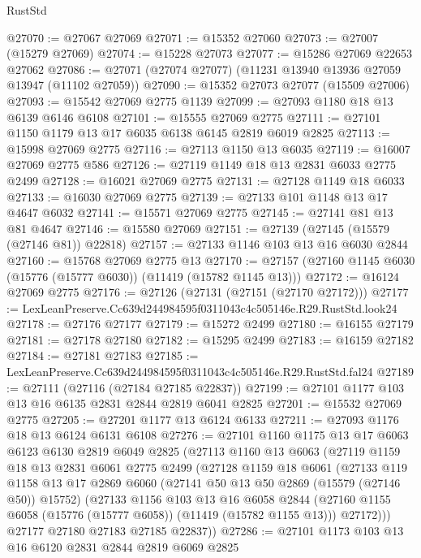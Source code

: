 \begin{lexlean}{RustStd}
\begin{coremodule}
@27070 := @27067 @27069
@27071 := @15352 @27060
@27073 := @27007 (@15279 @27069)
@27074 := @15228 @27073
@27077 := @15286 @27069 @22653 @27062
@27086 := @27071 (@27074 @27077) (@11231 @13940 @13936 @27059 @13947 (@11102 @27059))
@27090 := @15352 @27073 @27077 (@15509 @27006)
@27093 := @15542 @27069 @2775 @1139
@27099 := @27093 @1180 @18 @13 @6139 @6146 @6108
@27101 := @15555 @27069 @2775
@27111 := @27101 @1150 @1179 @13 @17 @6035 @6138 @6145 @2819 @6019 @2825
@27113 := @15998 @27069 @2775
@27116 := @27113 @1150 @13 @6035
@27119 := @16007 @27069 @2775 @586
@27126 := @27119 @1149 @18 @13 @2831 @6033 @2775 @2499
@27128 := @16021 @27069 @2775
@27131 := @27128 @1149 @18 @6033
@27133 := @16030 @27069 @2775
@27139 := @27133 @101 @1148 @13 @17 @4647 @6032
@27141 := @15571 @27069 @2775
@27145 := @27141 @81 @13 @81 @4647
@27146 := @15580 @27069
@27151 := @27139 (@27145 (@15579 (@27146 @81)) @22818)
@27157 := @27133 @1146 @103 @13 @16 @6030 @2844
@27160 := @15768 @27069 @2775 @13
@27170 := @27157 (@27160 @1145 @6030 (@15776 (@15777 @6030)) (@11419 (@15782 @1145 @13)))
@27172 := @16124 @27069 @2775
@27176 := @27126 (@27131 (@27151 (@27170 @27172)))
@27177 := LexLeanPreserve.Cc639d244984595f0311043c4c505146e.R29.RustStd.look24
@27178 := @27176 @27177
@27179 := @15272 @2499
@27180 := @16155 @27179
@27181 := @27178 @27180
@27182 := @15295 @2499
@27183 := @16159 @27182
@27184 := @27181 @27183
@27185 := LexLeanPreserve.Cc639d244984595f0311043c4c505146e.R29.RustStd.fal24
@27189 := @27111 (@27116 (@27184 @27185 @22837))
@27199 := @27101 @1177 @103 @13 @16 @6135 @2831 @2844 @2819 @6041 @2825
@27201 := @15532 @27069 @2775
@27205 := @27201 @1177 @13 @6124 @6133
@27211 := @27093 @1176 @18 @13 @6124 @6131 @6108
@27276 := @27101
    @1160
    @1175
    @13
    @17
    @6063
    @6123
    @6130
    @2819
    @6049
    @2825
    (@27113
      @1160
      @13
      @6063
      (@27119
        @1159
        @18
        @13
        @2831
        @6061
        @2775
        @2499
        (@27128
          @1159
          @18
          @6061
          (@27133
            @119
            @1158
            @13
            @17
            @2869
            @6060
            (@27141 @50 @13 @50 @2869 (@15579 (@27146 @50)) @15752)
            (@27133
              @1156
              @103
              @13
              @16
              @6058
              @2844
              (@27160 @1155 @6058 (@15776 (@15777 @6058)) (@11419 (@15782 @1155 @13)))
              @27172)))
        @27177
        @27180
        @27183
        @27185
        @22837))
@27286 := @27101 @1173 @103 @13 @16 @6120 @2831 @2844 @2819 @6069 @2825

\end{coremodule}
\end{lexlean}
